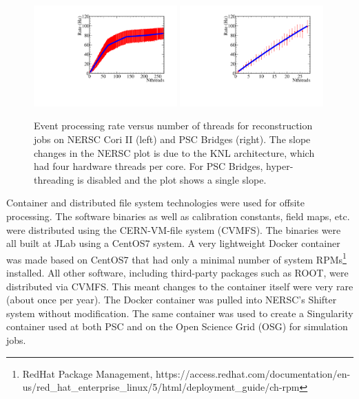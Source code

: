 \begin{figure}[htb]\centering
\includegraphics[width=0.49\textwidth]{figures/production_offsite_rate_vs_nthreads_NERSC.pdf}
\includegraphics[width=0.49\textwidth]{figures/production_offsite_rate_vs_nthreads_PSC.pdf}
\caption[]{\label{fig:production_offsite_rate_vs_nthreads_NERSC}Event processing rate versus number of threads for reconstruction jobs on NERSC Cori II (left) and PSC Bridges (right). The slope changes in the NERSC plot is due to the KNL architecture, which had four hardware threads per core. For PSC Bridges, hyper-threading is disabled and the plot shows a single slope.} 
\end{figure}

Container and distributed file system technologies were used for offsite processing. The software binaries as well as calibration constants, field maps, etc. were distributed using the CERN-VM-file system (CVMFS). 
The binaries were all built at JLab using a CentOS7 system. A very lightweight Docker container was made based on CentOS7 that had only a minimal number of system RPMs\footnote{RedHat Package Management, https://access.redhat.com/documentation/en-us/red\_hat\_enterprise\_linux/5/html/deployment\_guide/ch-rpm} installed. All other software, including third-party packages such as ROOT, were distributed via CVMFS. This meant changes to the container itself were very rare (about once per year). The Docker container was pulled into NERSC's Shifter system without modification. The same container was used to create a Singularity container used at both PSC and on the Open Science Grid (OSG) for simulation jobs.


